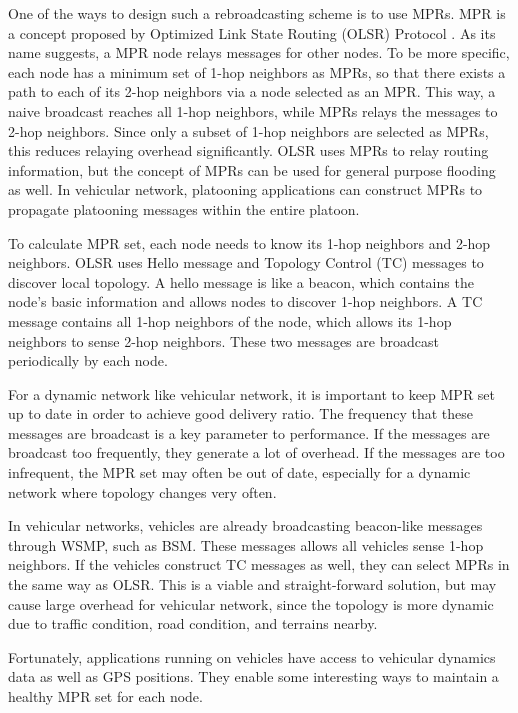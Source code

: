 \documentclass[12pt]{report}
\begin{document}
One of the ways to design such a rebroadcasting scheme is to use MPRs. MPR is a concept proposed by Optimized Link State Routing (OLSR) Protocol \cite{rfc3626}. As its name suggests, a MPR node relays messages for other nodes. To be more specific, each node has a minimum set of 1-hop neighbors as MPRs, so that there exists a path to each of its 2-hop neighbors via a node selected as an MPR. This way, a naive broadcast reaches all 1-hop neighbors, while MPRs relays the messages to 2-hop neighbors. Since only a subset of 1-hop neighbors are selected as MPRs, this reduces relaying overhead significantly. OLSR uses MPRs to relay routing information, but the concept of MPRs can be used for general purpose flooding as well. In vehicular network, platooning applications can construct MPRs to propagate platooning messages within the entire platoon.

To calculate MPR set, each node needs to know its 1-hop neighbors and 2-hop neighbors. OLSR uses Hello message and Topology Control (TC) messages to discover local topology. A hello message is like a beacon, which contains the node's basic information and allows nodes to discover 1-hop neighbors. A TC message contains all 1-hop neighbors of the node, which allows its 1-hop neighbors to sense 2-hop neighbors. These two messages are broadcast periodically by each node.

For a dynamic network like vehicular network, it is important to keep MPR set up to date in order to achieve good delivery ratio. The frequency that these messages are broadcast is a key parameter to performance. If the messages are broadcast too frequently, they generate a lot of overhead. If the messages are too infrequent, the MPR set may often be out of date, especially for a dynamic network where topology changes very often.

In vehicular networks, vehicles are already broadcasting beacon-like messages through WSMP, such as BSM. These messages allows all vehicles sense 1-hop neighbors. If the vehicles construct TC messages as well, they can select MPRs in the same way as OLSR. This is a viable and straight-forward solution, but may cause large overhead for vehicular network, since the topology is more dynamic due to traffic condition, road condition, and terrains nearby.

Fortunately, applications running on vehicles have access to vehicular dynamics data as well as GPS positions. They enable some interesting ways to maintain a healthy MPR set for each node.
\end{document}
